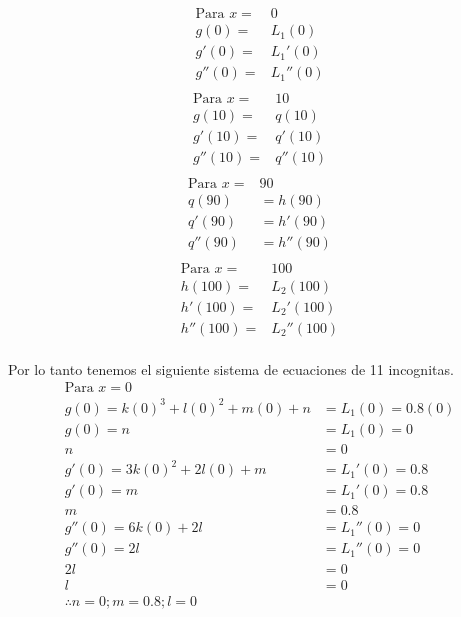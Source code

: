 \begin{multicols}{4}
	\noindent
	\begin{align*}
		\text{Para } x = & 0        \\
		g(0)  =          & L_1(0)   \\
		g'(0) =          & L_1'(0)  \\
		g''(0)=          & L_1''(0) \\
	\end{align*}
	\columnbreak
	\begin{align*}
		\text{Para } x = & 10      \\
		g(10)  =         & q(10)   \\
		g'(10) =         & q'(10)  \\
		g''(10)=         & q''(10) \\
	\end{align*}
	\columnbreak
	\begin{align*}
		\text{Para } x = & 90       \\
		q(90)            & =h(90)   \\
		q'(90)           & =h'(90)  \\
		q''(90)          & =h''(90) \\
	\end{align*}
	\columnbreak
	\begin{align*}
		\text{Para } x = & 100        \\
		h(100)  =        & L_2(100)   \\
		h'(100) =        & L_2'(100)  \\
		h''(100)=        & L_2''(100) \\
	\end{align*}
\end{multicols}

Por lo tanto tenemos el siguiente sistema de ecuaciones de 11 incognitas.
\begin{align*}
	\text{Para }x=0                                      \\
	g(0)  = k(0)^3 + l(0)^2 + m(0) + n & = L_1(0)=0.8(0) \\
	g(0)  =  n                         & = L_1(0)=0      \\
	n                                  & = 0             \\
	g'(0) =3k(0)^2 + 2l(0) + m         & = L_1'(0)=0.8   \\
	g'(0) = m                          & = L_1'(0)=0.8   \\
	m                                  & = 0.8           \\
	g''(0)=6k(0)+2l                    & = L_1''(0)=0    \\
	g''(0)=2l                          & = L_1''(0)=0    \\
	2l                                 & = 0             \\
	l                                  & = 0             \\
	\therefore n=0; m=0.8; l=0                           \\
\end{align*}

